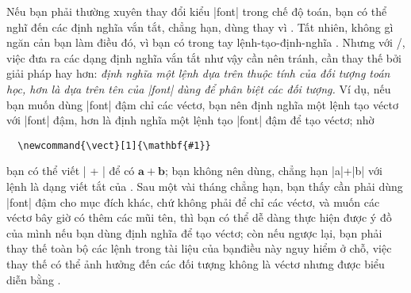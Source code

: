 \documentclass[11pt,leqno,titlepage,openany]{amsldoc}[1999/12/13]
\newcommand{\vect}[1]{\mathbf{#1}}
\begin{document}
Nếu bạn phải thường xuyên thay đổi kiểu |font| trong chế độ toán,
bạn có thể nghĩ đến các định nghĩa vắn tắt, chẳng hạn, dùng 
thay vì . Tất nhiên, không gì ngăn cản bạn làm điều đó,
vì bạn có trong tay lệnh-tạo-định-nghĩa . Nhưng với \latex/,
việc đưa ra các dạng định nghĩa vắn tắt như vậy cần nên tránh, cần thay thế
bởi giải pháp hay hơn: \emph{định nghĩa một lệnh dựa trên \emph{thuộc tính của
đối tượng toán học}, hơn là dựa trên tên của |font| dùng để phân biệt
các đối tượng.} Ví dụ, nếu bạn muốn dùng |font| đậm chỉ các véctơ, bạn
nên định nghĩa một lệnh tạo véctơ với |font| đậm, hơn là định nghĩa một
lệnh tạo |font| đậm để tạo véctơ; nhờ

\medskip
\begin{verbatim}
  \newcommand{\vect}[1]{\mathbf{#1}}
\end{verbatim}

\medskip\noindent
bạn có thể viết |\vect{a} + \vect{b}| để có $\vect{a}+\vect{b}$;
bạn không nên dùng, chẳng hạn |{a}|+|{b}| với lệnh 
là dạng viết tắt của .
Sau một vài tháng chẳng hạn, bạn thấy cần phải dùng |font| đậm cho mục đích khác,
chứ không phải để chỉ các véctơ, và muốn các véctơ bây giờ có thêm các mũi tên,
thì bạn có thể dễ dàng thực hiện được ý đồ của mình nếu bạn dùng định nghĩa
 để tạo véctơ; còn nếu ngược lại, bạn phải thay thế toàn bộ các lệnh
 trong tài liệu của bạn\mdash điều này nguy hiểm ở chỗ, việc thay thế
có thể ảnh hưởng đến các đối tượng không là véctơ nhưng được biểu diễn bằng
.
\end{document}
